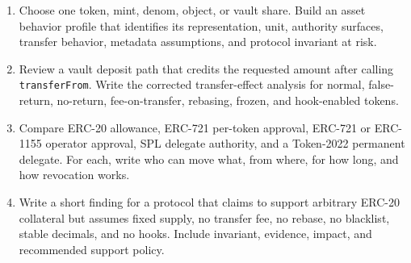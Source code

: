 \begin{enumerate}
\item Choose one token, mint, denom, object, or vault share. Build an asset behavior profile that identifies its representation, unit, authority surfaces, transfer behavior, metadata assumptions, and protocol invariant at risk.

\item Review a vault deposit path that credits the requested amount after calling \texttt{transferFrom}. Write the corrected transfer-effect analysis for normal, false-return, no-return, fee-on-transfer, rebasing, frozen, and hook-enabled tokens.

\item Compare ERC-20 allowance, ERC-721 per-token approval, ERC-721 or ERC-1155 operator approval, SPL delegate authority, and a Token-2022 permanent delegate. For each, write who can move what, from where, for how long, and how revocation works.

\item Write a short finding for a protocol that claims to support arbitrary ERC-20 collateral but assumes fixed supply, no transfer fee, no rebase, no blacklist, stable decimals, and no hooks. Include invariant, evidence, impact, and recommended support policy.
\end{enumerate}
